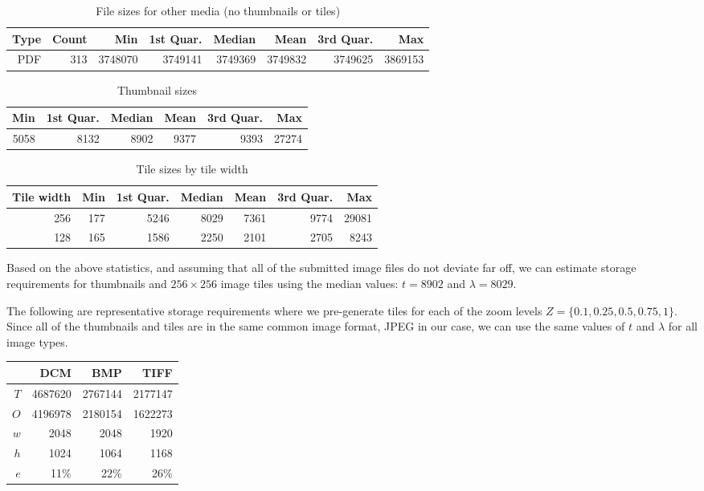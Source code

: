 \documentclass[a4paper]{amsart}
\begin{document}
\begin{table}[ht]
\begin{tabular}{r|rrrrrrr}
  Type & Count & Min & 1st Quar. & Median & Mean & 3rd Quar. & Max\\\hline
  PDF & 313 & 3748070 & 3749141 & 3749369 & 3749832 & 3749625 & 3869153
\end{tabular}
\caption{File sizes for other media (no thumbnails or tiles)}
\end{table}

\begin{table}[ht]
\begin{tabular}{rrrrrr}
Min & 1st Quar. & Median & Mean & 3rd Quar. & Max\\\hline
   5058 & 8132 & 8902 & 9377 & 9393 & 27274
\end{tabular}
\caption{Thumbnail sizes}
\end{table}

\begin{table}[ht]
\begin{tabular}{r|rrrrrr}
Tile width & Min & 1st Quar. & Median & Mean & 3rd Quar. & Max\\\hline
256 & 177 & 5246 & 8029 & 7361 & 9774 & 29081\\
128 & 165 & 1586 & 2250 & 2101 & 2705 & 8243
\end{tabular}
\caption{Tile sizes by tile width}
\end{table}

Based on the above statistics, and assuming that all of the submitted
image files do not deviate far off, we can estimate storage
requirements for thumbnails and $256\times 256$ image tiles using the
median values: $t = 8902$ and $\lambda = 8029$.

The following are representative storage requirements where we
pre-generate tiles for each of the zoom levels $Z =
\{0.1,0.25,0.5,0.75,1\}$. Since all of the thumbnails and tiles are in
the same common image format, JPEG in our case, we can use the same
values of $t$ and $\lambda$ for all image types.

\begin{table}[h]
\begin{tabular}{rrrr}
& DCM & BMP & TIFF\\\hline
$T$ & 4687620 & 2767144 & 2177147\\
$O$ & 4196978 & 2180154 & 1622273\\
$w$ & 2048 & 2048 & 1920\\
$h$ & 1024 & 1064 & 1168\\\hline
$e$ & 11\% & 22\% & 26\%
\end{tabular}
\end{table}
\end{document}
